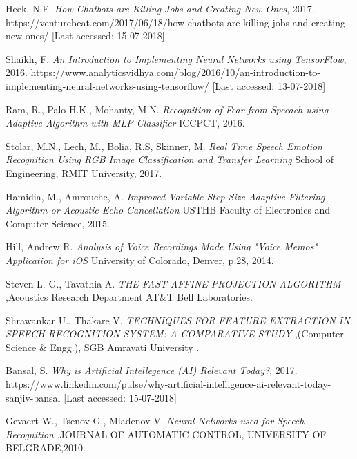 \documentclass[10pt,twocolumn]{witseiepaper}
\begin{document}
\vspace{7pt}

\begin{thebibliography}{1}
	
	 Heek, N.F. {\em How Chatbots are Killing Jobs and Creating New Ones}, 2017. https://venturebeat.com/2017/06/18/how-chatbots-are-killing-jobs-and-creating-new-ones/ [Last accessed: 15-07-2018]
	
	 Shaikh, F. {\em An Introduction to Implementing Neural Networks using TensorFlow}, 2016. https://www.analyticsvidhya.com/blog/2016/10/an-introduction-to-implementing-neural-networks-using-tensorflow/ [Last accessed: 13-07-2018]
	
	
	 Ram, R., Palo H.K., Mohanty, M.N. {\em Recognition of Fear from Speeach using Adaptive Algorithm with MLP Classifier} ICCPCT, 2016.
	
	 Stolar, M.N., Lech, M., Bolia, R.S, Skinner, M. {\em Real Time Speech Emotion Recognition Using RGB Image Classification and Transfer Learning} School of Engineering, RMIT University, 2017.
	
		
	 Hamidia, M., Amrouche, A. {\em Improved Variable Step-Size Adaptive Filtering Algorithm or Acoustic Echo Cancellation} USTHB Faculty of Electronics and Computer Science, 2015.
	
	
		 Hill, Andrew R. {\em Analysis of Voice Recordings Made Using "Voice Memos" Application for iOS} University of Colorado, Denver, p.28, 2014.
		
			 Steven L. G., Tavathia A. {\em THE FAST AFFINE PROJECTION ALGORITHM} ,Acoustics Research Department
		AT\&T Bell Laboratories.
		
		
		
		  Shrawankar  U., Thakare  V. {\em TECHNIQUES FOR FEATURE EXTRACTION IN SPEECH
			RECOGNITION SYSTEM: A COMPARATIVE STUDY} ,(Computer Science \& Engg.), SGB Amravati University .
	
	 Bansal, S. {\em Why is Artificial Intellegence (AI) Relevant Today?}, 2017. https://www.linkedin.com/pulse/why-artificial-intelligence-ai-relevant-today-sanjiv-bansal [Last accessed: 15-07-2018]
	
	
	
	 Gevaert W., Tsenov G., Mladenov V. {\em Neural Networks used for Speech Recognition } ,JOURNAL OF AUTOMATIC CONTROL, UNIVERSITY OF BELGRADE,2010.
	


\end{thebibliography}
\end{document}
